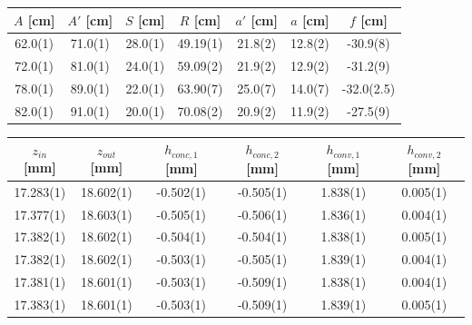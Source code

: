 \documentclass[a4paper,11pt]{article}
\begin{document}
            \begin{table}[t]   
                \centering
                \begin{tabular}{|c|c|c|c|c|c|c|}
                    \hline
                    $A$ [cm] & $A'$ [cm] & $S$ [cm] & $R$ [cm] & $a'$ [cm] & $a$ [cm] & $f$ [cm] \\
                    \hline
                    62.0(1) & 71.0(1) & 28.0(1) & 49.19(1) & 21.8(2) & 12.8(2) & -30.9(8)\\
                    \hline
                    72.0(1) & 81.0(1) & 24.0(1) & 59.09(2) & 21.9(2) & 12.9(2) & -31.2(9)\\
                    \hline
                    78.0(1) & 89.0(1) & 22.0(1) & 63.90(7) & 25.0(7) & 14.0(7) & -32.0(2.5)\\
                    \hline
                    82.0(1) & 91.0(1) & 20.0(1) & 70.08(2) & 20.9(2) & 11.9(2) & -27.5(9)\\
                    \hline
                \end{tabular}
                \captionsetup{justification=centering, font=footnotesize}
                \vspace{10pt}
                \begin{tabular}{|c|c|c|c|c|c|}
                    \hline
                    $z_{in}$ [mm] & $z_{out}$ [mm] & $h_{conc, 1}$ [mm] & $h_{conc, 2}$ [mm] & $h_{conv, 1}$ [mm] & $h_{conv, 2}$ [mm] \\
                    \hline
                    17.283(1) & 18.602(1) & -0.502(1) & -0.505(1) & 1.838(1) & 0.005(1)\\
                    \hline
                    17.377(1) & 18.603(1) & -0.505(1) & -0.506(1) & 1.836(1) & 0.004(1)\\
                    \hline
                    17.382(1) & 18.602(1) & -0.504(1) & -0.504(1) & 1.838(1) & 0.005(1)\\
                    \hline
                    17.382(1) & 18.602(1) & -0.503(1) & -0.505(1) & 1.839(1) & 0.004(1)\\
                    \hline
                    17.381(1) & 18.601(1) & -0.503(1) & -0.509(1) & 1.838(1) & 0.004(1)\\
                    \hline
                    17.383(1) & 18.601(1) & -0.503(1) & -0.509(1) & 1.839(1) & 0.005(1)\\

\end{tabular}
\end{table}
\end{document}
